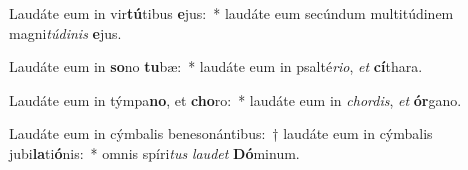 \item Laudáte eum in vir\textbf{tú}tibus \textbf{e}jus:~* laudáte eum secúndum multitúdinem magni\textit{tú}\textit{di}\textit{nis} \textbf{e}jus.
\item Laudáte eum in \textbf{so}no \textbf{tu}bæ:~* laudáte eum in psalté\textit{ri}\textit{o}, \textit{et} \textbf{cí}thara.
\item Laudáte eum in týmpa\textbf{no}, et \textbf{cho}ro:~* laudáte eum in \textit{chor}\textit{dis}, \textit{et} \textbf{ór}gano.
\item Laudáte eum in cýmbalis benesonántibus:~† laudáte eum in cýmbalis jubi\textbf{la}ti\textbf{ó}nis:~* omnis spíri\textit{tus} \textit{lau}\textit{det} \textbf{Dó}minum.
